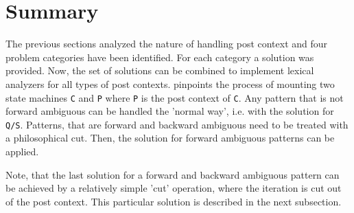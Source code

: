 \section{Summary}

The previous sections analyzed the nature of handling post context and
four problem categories have been identified.  For each category a
solution was provided. Now, the set of solutions can be combined to implement
lexical analyzers for all types of post contexts.  
pinpoints the process of mounting two state machines {\tt C} and {\tt P}
where {\tt P} is the post context of {\tt C}. Any pattern that is not forward 
ambiguous can be handled the 'normal way', i.e. with the solution for {\tt Q/S}.
Patterns, that are forward and backward ambiguous need to be treated with a philosophical cut.
Then, the solution for forward ambiguous patterns can be applied.

Note, that the last
 solution for a forward and backward ambiguous pattern can be achieved
by a relatively simple 'cut' operation, where the iteration is cut out of 
the post context. This particular solution is described in the next subsection.

